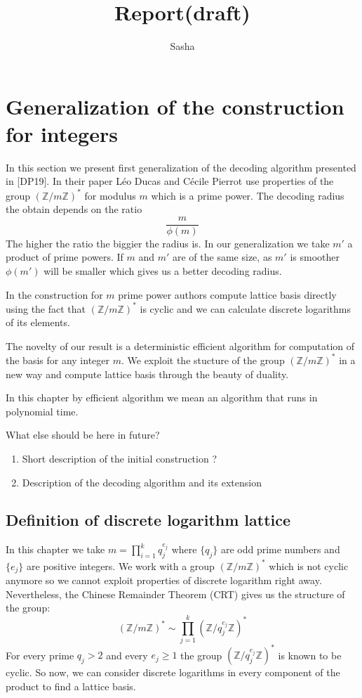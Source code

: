 \documentclass[12pt]{article}
\title{Report(draft)}
\author{ Sasha }
\newcommand{\ZZ}{\mathbb{Z}}
\begin{document}
\maketitle

\section{Generalization of the construction for integers}
In this section we present first generalization of the decoding algorithm presented in [DP19]. In their paper Léo Ducas and Cécile Pierrot use properties of the group $(\ZZ/m\ZZ)^*$ for modulus $m$ which is a prime power. The decoding radius the obtain  depends on the ratio
\[
\frac{m}{\phi(m)}
\]
The higher the ratio the biggier the radius is. In our generalization we take $m'$ a product of prime powers. If $m$ and $m'$ are of the same size, as $m'$ is smoother $\phi(m')$ will be smaller which gives us a better decoding radius.

In the construction for $m$ prime power authors compute lattice basis directly using the fact that $(\ZZ/m\ZZ)^*$ is cyclic and we can calculate discrete logarithms of its elements.

The novelty of our result is a deterministic efficient algorithm for computation of the basis for any integer $m$. We exploit the stucture of the group $(\ZZ/m\ZZ)^*$ in a new way and compute lattice basis through the beauty of duality.

In this chapter by efficient algorithm we mean an algorithm that runs in polynomial time.

What else should be here in future?
\begin{enumerate}
    \item Short description of the initial construction ?
    \item Description of the decoding algorithm and its extension
\end{enumerate}


\subsection{Definition of discrete logarithm lattice }
\label{definition section}
In this chapter we take $m = \prod_{i=1}^{k} q_{j}^{e_{j}}$ where $\{q_{j}\}$ are odd prime numbers and $\{e_{j}\}$ are positive integers. We work with a group $(\ZZ/m\ZZ)^*$ which is not cyclic anymore so we cannot exploit properties of discrete logarithm right away. Nevertheless, the Chinese Remainder Theorem (CRT) gives us the structure of the group:
\[
    (\ZZ/m\ZZ)^* \sim \prod_{j=1}^{k}(\ZZ/q_{j}^{e_{j}}\ZZ)^*
\]
For every prime $q_{j} > 2$ and every $e_{j} \geq 1$ the group $(\ZZ/q_{j}^{e_{j}}\ZZ)^*$ is known to be cyclic. So now, we can consider discrete logarithms in every component of the product to find a lattice basis.
\end{document}

